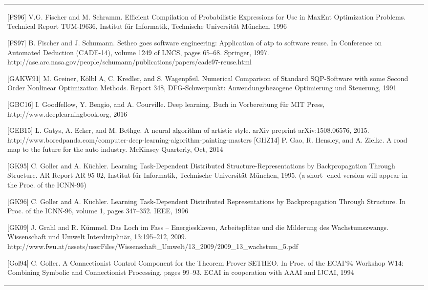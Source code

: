 \documentclass[10pt]{book}
\begin{document}
\begin{tabular}{|l|l|}
[FS96] V.G. Fischer and M. Schramm. Efficient Compilation of Probabilistic Expressions for Use in MaxEnt Optimization Problems. Technical Report TUM-I9636, Institut f\"ur Informatik, Technische Universit\"at M\"unchen, 1996

[FS97] B. Fischer and J. Schumann. Setheo goes software engineering: Application of atp to software reuse. In Conference on Automated Deduction (CADE-14), volume 1249 of LNCS, pages 65--68. Springer, 1997. http://ase.arc.nasa.gov/people/schumann/publications/papers/cade97-reuse.html

[GAKW91] M. Greiner, K\"olbl A, C. Kredler, and S. Wagenpfeil. Numerical Comparison of Standard SQP-Software with some Second Order Nonlinear Optimization Methods. Report 348, DFG-Schwerpunkt: Anwendungsbezogene Optimierung und Steuerung, 1991

[GBC16] I. Goodfellow, Y. Bengio, and A. Courville. Deep learning. Buch in Vorbereitung f\"ur MIT Press, http://www.deeplearningbook.org, 2016

[GEB15] L. Gatys, A. Ecker, and M. Bethge. A neural algorithm of artistic style. arXiv preprint arXiv:1508.06576, 2015. http://www.boredpanda.com/computer-deep-learning-algorithm-painting-masters
[GHZ14] P. Gao, R. Hensley, and A. Zielke. A road map to the future for the auto industry. McKinsey Quarterly, Oct, 2014

[GK95] C. Goller and A. K\"uchler. Learning Task-Dependent Distributed Structure-Representations by Backpropagation Through Structure. AR-Report AR-95-02, Institut f\"ur Informatik, Technische Universit\"at M\"unchen, 1995. (a short- ened version will appear in the Proc. of the ICNN-96)

[GK96] C. Goller and A. K\"uchler. Learning Task-Dependent Distributed Representations by Backpropagation Through Structure. In Proc. of the ICNN-96, volume 1, pages 347--352. IEEE, 1996

[GK09] J. Grahl and R. K\"ummel. Das Loch im Fass -- Energiesklaven, Arbeitspl\"atze und die Milderung des Wachstumszwangs. Wissenschaft und Umwelt Interdiziplin\"ar, 13:195--212, 2009. http://www.fwu.at/assets/userFiles/Wissenschaft\_Umwelt/13\_2009/2009\_13\_wachstum\_5.pdf

[Gol94] C. Goller. A Connectionist Control Component for the Theorem Prover SETHEO. In Proc. of the ECAI'94 Workshop W14: Combining Symbolic and Connectionist Processing, pages 99--93. ECAI in cooperation with AAAI and IJCAI, 1994


\end{tabular}
\end{document}
